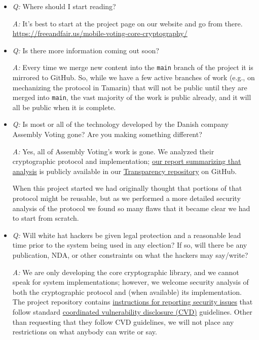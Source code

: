 \documentclass[12pt,letter]{article}
\begin{document}
\begin{itemize}

    \item \emph{Q:} Where should I start reading?

    \emph{A:} It's best to start at the project page on our website and go from there. \\
    \href{https://freeandfair.us/mobile-voting-core-cryptography/}{https://freeandfair.us/mobile-voting-core-cryptography/}

    \item \emph{Q:} Is there more information coming out soon?

    \emph{A:} Every time we merge new content into the \texttt{main} branch of the project it is mirrored to GitHub.  So, while we have a few active branches of work (e.g., on mechanizing the protocol in Tamarin) that will not be public until they are merged into \texttt{main}, the vast majority of the work is public already, and it will all be public when it is complete.

    \item \emph{Q:} Is most or all of the technology developed by the Danish company Assembly Voting gone? Are you making something different?

    \emph{A:} Yes, all of Assembly Voting's work is gone.  We analyzed their cryptographic protocol and implementation; \href{https://github.com/FreeAndFair/Transparency/blob/master/Project_Artifacts/Tusk_2024_Review/cryptographic-protocol-review-and-gap-analysis.pdf}{our report summarizing that analysis} is publicly available in our \href{https://github.com/FreeAndFair/Transparency}{Transparency repository} on GitHub.

    When this project started we had originally thought that portions of that protocol might be reusable, but as we performed a more detailed security analysis of the protocol we found so many flaws that it became clear we had to start from scratch.

    \item \emph{Q:} Will white hat hackers be given legal protection and a reasonable lead time prior to the system being used in any election?  If so, will there be any publication, NDA, or other constraints on what the hackers may say/write?

    \emph{A:} We are only developing the core cryptographic library, and we cannot speak for system implementations; however, we welcome security analysis of both the cryptographic protocol and (when available) its implementation. The project repository contains \href{https://github.com/FreeAndFair/MobileVotingCoreCryptography/blob/main/SECURITY.md}{instructions for reporting security issues} that follow standard \href{https://en.wikipedia.org/wiki/Coordinated_vulnerability_disclosure}{coordinated vulnerability disclosure (CVD)} guidelines. Other than requesting that they follow CVD guidelines, we will not place any restrictions on what anybody can write or say.

\end{itemize}
\end{document}
